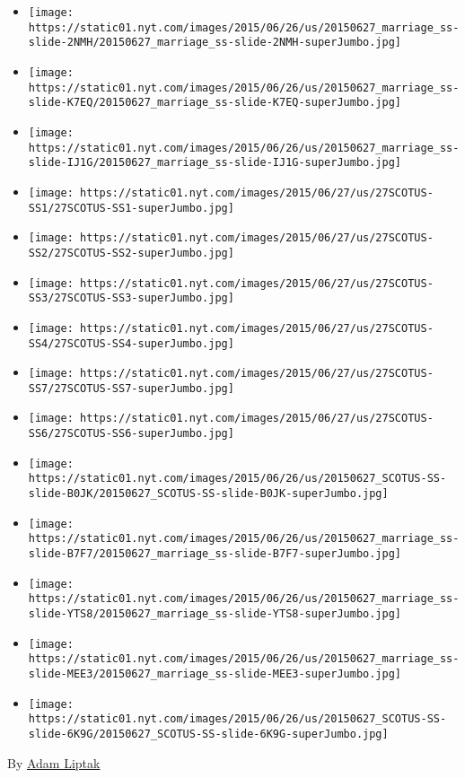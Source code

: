 \begin{itemize}
\item
  \texttt{[image: https://static01.nyt.com/images/2015/06/26/us/20150627\_marriage\_ss-slide-2NMH/20150627\_marriage\_ss-slide-2NMH-superJumbo.jpg]}
\item
  \texttt{[image: https://static01.nyt.com/images/2015/06/26/us/20150627\_marriage\_ss-slide-K7EQ/20150627\_marriage\_ss-slide-K7EQ-superJumbo.jpg]}
\item
  \texttt{[image: https://static01.nyt.com/images/2015/06/26/us/20150627\_marriage\_ss-slide-IJ1G/20150627\_marriage\_ss-slide-IJ1G-superJumbo.jpg]}
\item
  \texttt{[image: https://static01.nyt.com/images/2015/06/27/us/27SCOTUS-SS1/27SCOTUS-SS1-superJumbo.jpg]}
\item
  \texttt{[image: https://static01.nyt.com/images/2015/06/27/us/27SCOTUS-SS2/27SCOTUS-SS2-superJumbo.jpg]}
\item
  \texttt{[image: https://static01.nyt.com/images/2015/06/27/us/27SCOTUS-SS3/27SCOTUS-SS3-superJumbo.jpg]}
\item
  \texttt{[image: https://static01.nyt.com/images/2015/06/27/us/27SCOTUS-SS4/27SCOTUS-SS4-superJumbo.jpg]}
\item
  \texttt{[image: https://static01.nyt.com/images/2015/06/27/us/27SCOTUS-SS7/27SCOTUS-SS7-superJumbo.jpg]}
\item
  \texttt{[image: https://static01.nyt.com/images/2015/06/27/us/27SCOTUS-SS6/27SCOTUS-SS6-superJumbo.jpg]}
\item
  \texttt{[image: https://static01.nyt.com/images/2015/06/26/us/20150627\_SCOTUS-SS-slide-B0JK/20150627\_SCOTUS-SS-slide-B0JK-superJumbo.jpg]}
\item
  \texttt{[image: https://static01.nyt.com/images/2015/06/26/us/20150627\_marriage\_ss-slide-B7F7/20150627\_marriage\_ss-slide-B7F7-superJumbo.jpg]}
\item
  \texttt{[image: https://static01.nyt.com/images/2015/06/26/us/20150627\_marriage\_ss-slide-YTS8/20150627\_marriage\_ss-slide-YTS8-superJumbo.jpg]}
\item
  \texttt{[image: https://static01.nyt.com/images/2015/06/26/us/20150627\_marriage\_ss-slide-MEE3/20150627\_marriage\_ss-slide-MEE3-superJumbo.jpg]}
\item
  \texttt{[image: https://static01.nyt.com/images/2015/06/26/us/20150627\_SCOTUS-SS-slide-6K9G/20150627\_SCOTUS-SS-slide-6K9G-superJumbo.jpg]}
\end{itemize}

By \href{http://www.nytimes.com/by/adam-liptak}{Adam Liptak}

